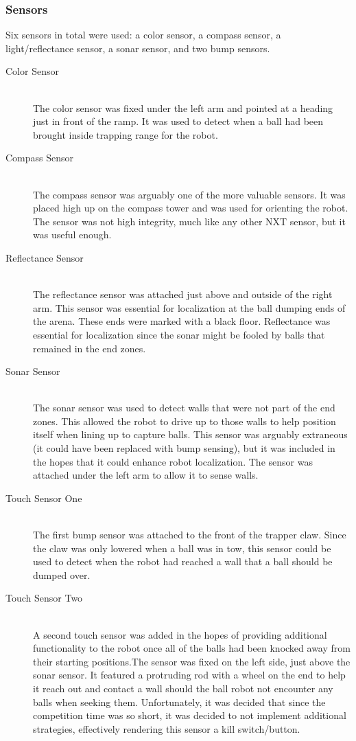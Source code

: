 \documentclass{article}
\begin{document}
\subsubsection{Sensors}
Six sensors in total were used: a color sensor, a compass sensor, a light/reflectance sensor, a sonar sensor, and two bump sensors.

\begin{description}
  \item[Color Sensor] \hfill \\
  The color sensor was fixed under the left arm and pointed at a heading just in front of the ramp. It was used to detect when a ball had been brought inside trapping range for the robot.

  \item[Compass Sensor] \hfill \\
  The compass sensor was arguably one of the more valuable sensors. It was placed high up on the compass tower and was used for orienting the robot. The sensor was not high integrity, much like any other NXT sensor, but it was useful enough.

  \item[Reflectance Sensor] \hfill \\
  The reflectance sensor was attached just above and outside of the right arm. This sensor was essential for localization at the ball dumping ends of the arena. These ends were marked with a black floor. Reflectance was essential for localization since the sonar might be fooled by balls that remained in the end zones.

  \item[Sonar Sensor] \hfill \\
  The sonar sensor was used to detect walls that were not part of the end zones. This allowed the robot to drive up to those walls to help position itself when lining up to capture balls. This sensor was arguably extraneous (it could have been replaced with bump sensing), but it was included in the hopes that it could enhance robot localization. The sensor was attached under the left arm to allow it to sense walls.

  \item[Touch Sensor One] \hfill \\
  The first bump sensor was attached to the front of the trapper claw. Since the claw was only lowered when a ball was in tow, this sensor could be used to detect when the robot had reached a wall that a ball should be dumped over.

  \item[Touch Sensor Two] \hfill \\
  A second touch sensor was added in the hopes of providing additional functionality to the robot once all of the balls had been knocked away from their starting positions.The sensor was fixed on the left side, just above the sonar sensor. It featured a protruding rod with a wheel on the end to help it reach out and contact a wall should the ball robot not encounter any balls when seeking them. Unfortunately, it was decided that since the competition time was so short, it was decided to not implement additional strategies, effectively rendering this sensor a kill switch/button.
\end{description}
\end{document}
